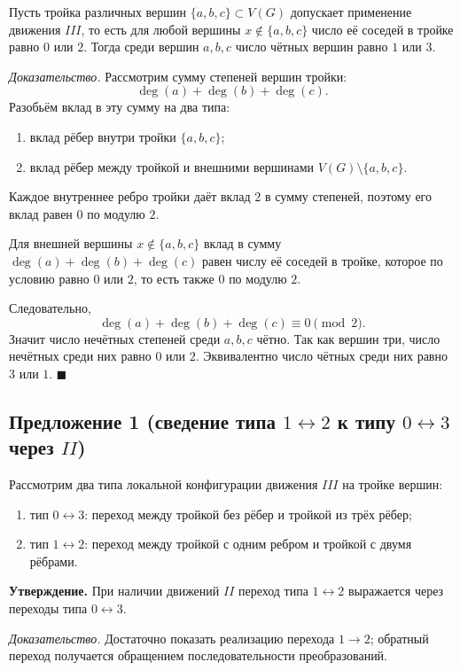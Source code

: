 \documentclass[12pt,a4paper]{article}
\begin{document}
Пусть тройка различных вершин $\{a,b,c\}\subset V(G)$ допускает применение движения $III$,
то есть для любой вершины $x\notin\{a,b,c\}$ число её соседей в тройке равно $0$ или $2$.
Тогда среди вершин $a,b,c$ число чётных вершин равно $1$ или $3$.

\textit{Доказательство.}
Рассмотрим сумму степеней вершин тройки:
\[
\deg(a)+\deg(b)+\deg(c).
\]
Разобьём вклад в эту сумму на два типа:
\begin{enumerate}
\item вклад рёбер внутри тройки $\{a,b,c\}$;
\item вклад рёбер между тройкой и внешними вершинами $V(G)\setminus\{a,b,c\}$.
\end{enumerate}

Каждое внутреннее ребро тройки даёт вклад $2$ в сумму степеней,
поэтому его вклад равен $0$ по модулю $2$.

Для внешней вершины $x\notin\{a,b,c\}$ вклад в сумму
$\deg(a)+\deg(b)+\deg(c)$ равен числу её соседей в тройке,
которое по условию равно $0$ или $2$, то есть также $0$ по модулю $2$.

Следовательно,
\[
\deg(a)+\deg(b)+\deg(c)\equiv 0\pmod 2.
\]
Значит число нечётных степеней среди $a,b,c$ чётно. Так как вершин три,
число нечётных среди них равно $0$ или $2$.
Эквивалентно число чётных среди них равно $3$ или $1$.
$\blacksquare$

\subsection*{Предложение 1 (сведение типа $1\leftrightarrow 2$ к типу $0\leftrightarrow 3$ через $II$)}

Рассмотрим два типа локальной конфигурации движения $III$ на тройке вершин:
\begin{enumerate}
\item тип $0\leftrightarrow 3$: переход между тройкой без рёбер и тройкой из трёх рёбер;
\item тип $1\leftrightarrow 2$: переход между тройкой с одним ребром и тройкой с двумя рёбрами.
\end{enumerate}

\textbf{Утверждение.}
При наличии движений $II$ переход типа $1\leftrightarrow 2$ выражается через переходы
типа $0\leftrightarrow 3$.

\textit{Доказательство.}
Достаточно показать реализацию перехода $1\to 2$; обратный переход получается обращением
последовательности преобразований.
\end{document}
